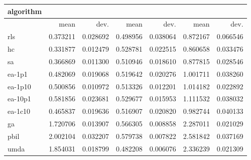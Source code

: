\begin{tabular}{@{}l*{6}{>{{}}N{1}{2}}@{}}
\toprule
{algorithm} &  &  &  \\
\midrule
& {mean} & {dev.} & {mean} & {dev.} & {mean} & {dev.} \\
\midrule
rls & 0.373211 & 0.028692 & 0.498956 & 0.038064 & 0.872167 & 0.066546 \\
 hc & 0.331877 & 0.012479 & 0.528781 & 0.022515 & 0.860658 & 0.033476 \\
 sa & 0.366869 & 0.011300 & 0.510946 & 0.018610 & 0.877815 & 0.028546 \\
 ea-1p1 & 0.482069 & 0.019068 & 0.519642 & 0.020276 & 1.001711 & 0.038260 \\
 ea-1p10 & 0.500856 & 0.010972 & 0.513326 & 0.012201 & 1.014182 & 0.022892 \\
 ea-10p1 & 0.581856 & 0.023681 & 0.529677 & 0.015953 & 1.111532 & 0.038032 \\
 ea-1c10 & 0.465837 & 0.019636 & 0.516907 & 0.020820 & 0.982744 & 0.040133 \\
 ga & 1.720706 & 0.013907 & 0.566305 & 0.008858 & 2.287011 & 0.021029 \\
 pbil & 2.002104 & 0.032207 & 0.579738 & 0.007822 & 2.581842 & 0.037169 \\
 umda & 1.854031 & 0.018799 & 0.482208 & 0.006076 & 2.336239 & 0.021309 \\
 \bottomrule
\end{tabular}
